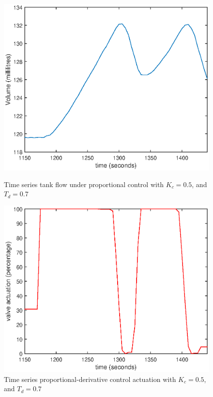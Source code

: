 \documentclass{article}
\begin{document}
\begin{figure}[h]
	\centering
	\begin{minipage}{0.45\textwidth}
		\centering
		\includegraphics[scale=0.4]{PD_Kc_05_Td_07}
		\caption{Time series tank flow under proportional control with $K_c = 0.5$, and $T_d = 0.7$}
	\end{minipage}
	\hspace{0.5cm}
	\begin{minipage}{0.45\textwidth}
		\centering
		\includegraphics[scale=0.4]{PD_Kc_05_Td_07_control}
		\caption{Time series proportional-derivative control actuation with $K_c = 0.5$, and $T_d = 0.7$}
	\end{minipage}
\end{figure}
\end{document}

